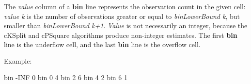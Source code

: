 The \textit{value} column of a \textbf{bin} line represents the observation
count in the given cell: \textit{value k} is the number of observations
greater or equal to \textit{binLowerBound k}, but smaller than
\textit{binLowerBound k+1}. \textit{Value} is not necessarily an
integer, because the cKSplit and cPSquare algorithms produce
non{}-integer estimates. The first \textbf{bin} line is the underflow
cell, and the last \textbf{bin} line is the overflow cell.


Example:

\begin{filelisting}
bin -INF  0
bin 0 4
bin 2 6
bin 4 2
bin 6 1
\end{filelisting}


